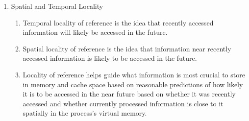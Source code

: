 \documentclass{article}
\begin{document}
\begin{enumerate}
\item Spatial and Temporal Locality
\begin{enumerate}
\renewcommand{\theenumi}{\Alph{enumi}}
\item Temporal locality of reference is the idea that recently accessed information will likely be accessed in the future.
\item Spatial locality of reference is the idea that information near recently accessed information is likely to be accessed in the future.
\item Locality of reference helps guide what information is most crucial to store in memory and cache space based on reasonable predictions of how likely it is to be accessed in the near future based on whether it was recently accessed and whether currently processed information is close to it spatially in the process's virtual memory.
\end{enumerate}


\end{enumerate}
\end{document}
